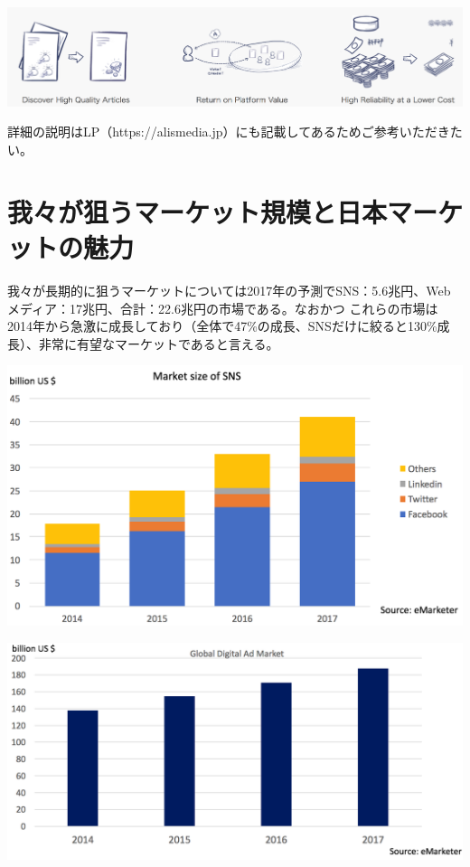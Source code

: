 \documentclass{jsarticle}
\begin{document}
\begin{center}
	\includegraphics[scale=0.4]{img/features.png}
\end{center}

詳細の説明はLP（https://alismedia.jp）にも記載してあるためご参考いただきたい。

\section{我々が狙うマーケット規模と日本マーケットの魅力}
我々が長期的に狙うマーケットについては2017年の予測でSNS：5.6兆円、Webメディア：17兆円、合計：22.6兆円の市場である。なおかつ
これらの市場は2014年から急激に成長しており（全体で47\%の成長、SNSだけに絞ると130\%成長）、非常に有望なマーケットであると言える。

\begin{center}
	\includegraphics[scale=0.4]{img/sns-marketsize.png}
\end{center}

\begin{center}
	\includegraphics[scale=0.4]{img/digitalad-marketsize.png}
\end{center}
\end{document}
